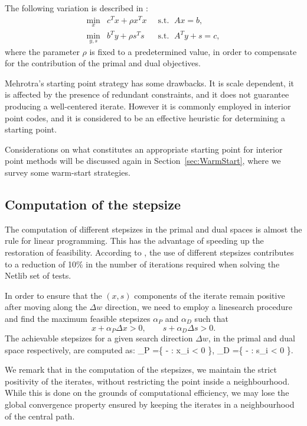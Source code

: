 The following variation is described in \cite{GondzioTerlaky}:
\begin{eqnarray*} 
  \min_x    \!\! & c^Tx + \rho x^Tx & \;\;\mbox{s.t. }\; Ax = b,      \\
  \min_{y,s}\!\! & b^Ty + \rho s^Ts & \;\;\mbox{s.t. }\; A^Ty + s = c,
\end{eqnarray*}
where the parameter $\rho$ is fixed to a predetermined value, in order
to compensate for the contribution of the primal and dual objectives.

Mehrotra's starting point strategy has some drawbacks. It is scale dependent,
it is affected by the presence of redundant constraints,
and it does not guarantee producing a well-centered iterate.
However it is commonly employed in interior point codes, and it is
considered to be an effective heuristic for determining a starting point.

Considerations on what constitutes an appropriate starting point 
for interior point methods will be discussed
again in Section~\ref{sec:WarmStart}, where we survey some
warm-start strategies.

%
%
\subsection{Computation of the stepsize}

The computation of different stepsizes in the primal and dual spaces is
almost the rule for linear programming.
This has the advantage of
speeding up the restoration of feasibility. According to
\cite{GondzioTerlaky}, the use of different stepsizes contributes 
to a reduction of 10\% in the number of iterations required 
when solving the Netlib 
set of tests.

In order to ensure that the $(x,s)$ components of the iterate
remain positive after moving along the
$\Delta w$ direction, we need to employ a linesearch procedure 
and find the maximum feasible stepsizes $\alpha_P$ and $\alpha_D$ 
such that
\[
  x + \alpha_P \Delta x > 0, \qquad  s + \alpha_D \Delta s > 0.
\]
The achievable stepsizes for a given search direction $\Delta w$, 
in the primal and dual space respectively, are computed as:
\be  \label{eq:Alphas}
  \alpha_P =\min \left\{ - : \Delta x_i < 0 \right\},
  \quad\;
  \alpha_D =\min \left\{ - : \Delta s_i < 0 \right\}.
\ee

We remark that in the computation of the stepsizes, we 
maintain the strict positivity of the iterates, without restricting
the point inside a neighbourhood.
While this is done on the grounds of computational efficiency, we may
lose the global convergence property ensured by keeping the
iterates in a neighbourhood of the central path.


